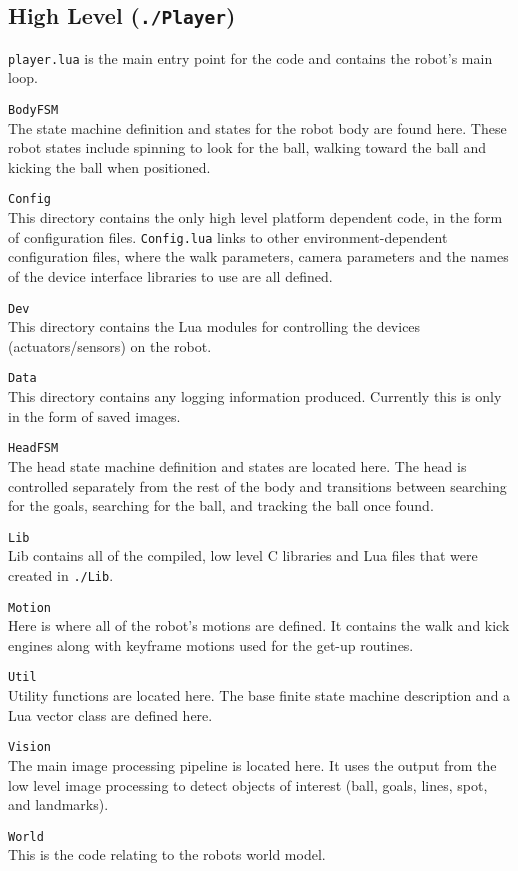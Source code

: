 \documentclass{article}
\begin{document}
  \subsection{High Level (\texttt{./Player})}
  
    \texttt{player.lua} is the main entry point for the code and contains the robot's main loop.
    
    \begin{description}
      \item \texttt{BodyFSM} \\
        The state machine definition and states for the robot body are found here. These robot states include spinning to look for the ball, walking toward the ball and kicking the ball when positioned.  
      \item \texttt{Config} \\
        This directory contains the only high level platform dependent code, in the form of configuration files. \texttt{Config.lua} links to other environment-dependent configuration files, where the walk parameters, camera parameters and the names of the device interface libraries to use are all defined. 
      \item \texttt{Dev} \\
        This directory contains the Lua modules for controlling the devices (actuators/sensors) on the robot.
      \item \texttt{Data} \\
        This directory contains any logging information produced. Currently this is only in the form of saved images.
      \item \texttt{HeadFSM} \\
        The head state machine definition and states are located here. The head is controlled separately from the rest of the body and transitions between searching for the goals, searching for the ball, and tracking the ball once found.
      \item \texttt{Lib} \\
        Lib contains all of the compiled, low level C libraries and Lua files that were created in \texttt{./Lib}.
      \item \texttt{Motion} \\
        Here is where all of the robot's motions are defined. It contains the walk and kick engines along with keyframe motions used for the get-up routines.
      \item \texttt{Util} \\
        Utility functions are located here. The base finite state machine description and a Lua vector class are defined here.
      \item \texttt{Vision} \\
        The main image processing pipeline is located here. It uses the output from the low level image processing to detect objects of interest (ball, goals, lines, spot, and landmarks).
      \item \texttt{World} \\
        This is the code relating to the robots world model.
    \end{description}
\end{document}
